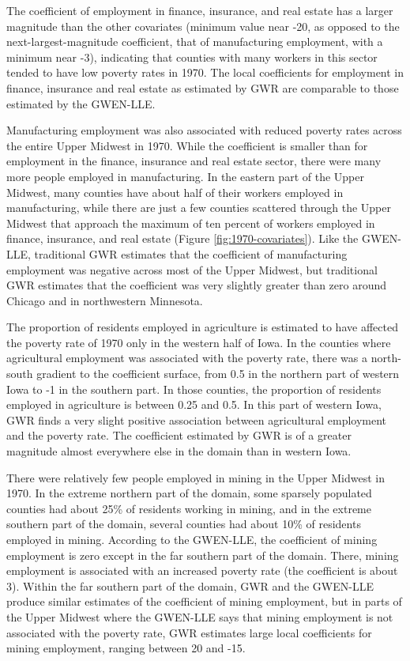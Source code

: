 \documentclass[authoryear, review, 11pt]{elsarticle}
\begin{document}
The coefficient of employment in finance, insurance, and real estate has a larger magnitude than the other covariates (minimum value near -20, as opposed to the next-largest-magnitude coefficient, that of manufacturing employment, with a minimum near -3), indicating that counties with many workers in this sector tended to have low poverty rates in 1970. The local coefficients for employment in finance, insurance and real estate as estimated by GWR are comparable to those estimated by the GWEN-LLE.

Manufacturing employment was also associated with reduced poverty rates across the entire Upper Midwest in 1970. While the coefficient is smaller than for employment in the finance, insurance and real estate sector, there were many more people employed in manufacturing. In the eastern part of the Upper Midwest, many counties have about half of their workers employed in manufacturing, while there are just a few counties scattered through the Upper Midwest that approach the maximum of ten percent of workers employed in finance, insurance, and real estate (Figure \ref{fig:1970-covariates}). Like the GWEN-LLE, traditional GWR estimates that the coefficient of manufacturing employment was negative across most of the Upper Midwest, but traditional GWR estimates that the coefficient was very slightly greater than zero around Chicago and in northwestern Minnesota.

The proportion of residents employed in agriculture is estimated to have affected the poverty rate of 1970 only in the western half of Iowa. In the counties where agricultural employment was associated with the poverty rate, there was a north-south gradient to the coefficient surface, from 0.5 in the northern part of western Iowa to -1 in the southern part. In those counties, the proportion of residents employed in agriculture is between 0.25 and 0.5. In this part of western Iowa, GWR finds a very slight positive association between agricultural employment and the poverty rate. The coefficient estimated by GWR is of a greater magnitude almost everywhere else in the domain than in western Iowa.

There were relatively few people employed in mining in the Upper Midwest in 1970. In the extreme northern part of the domain, some sparsely populated counties had about 25\% of residents working in mining, and in the extreme southern part of the domain, several counties had about 10\% of residents employed in mining. According to the GWEN-LLE, the coefficient of mining employment is zero except in the far southern part of the domain. There, mining employment is associated with an increased poverty rate (the coefficient is about 3). Within the far southern part of the domain, GWR and the GWEN-LLE produce similar estimates of the coefficient of mining employment, but in parts of the Upper Midwest where the GWEN-LLE says that mining employment is not associated with the poverty rate, GWR estimates large local coefficients for mining employment, ranging between 20 and -15.
\end{document}
